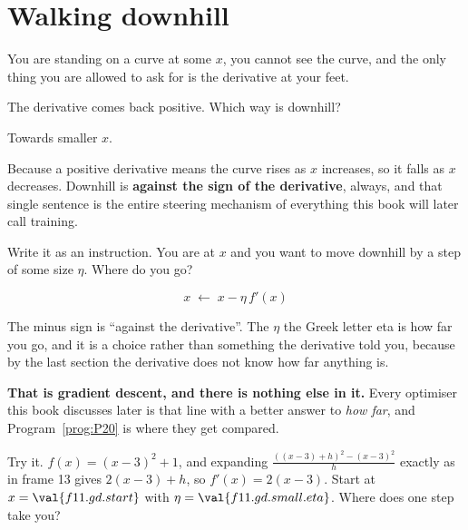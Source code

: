 \section{Walking downhill}
\label{sec:F11-downhill}

\begin{fr}
You are standing on a curve at some $x$, you cannot see the curve, and the
only thing you are allowed to ask for is the derivative at your feet.

The derivative comes back positive. Which way is downhill?
\nextframe
\end{fr}

\begin{fr}
\begin{ansblock}
Towards smaller $x$.
\end{ansblock}

Because a positive derivative means the curve rises as $x$ increases, so it
falls as $x$ decreases. Downhill is \textbf{against the sign of the
derivative}, always, and that single sentence is the entire steering mechanism
of everything this book will later call training.

Write it as an instruction. You are at $x$ and you want to move downhill by a
step of some size $\eta$. Where do you go?
\nextframe
\end{fr}

\begin{fr}
\begin{ansblock}
\[ x \;\longleftarrow\; x - \eta\, f'(x) \]
\end{ansblock}

The minus sign is \enquote{against the derivative}. The $\eta$ \dash{} the
Greek letter eta \dash{} is how far you go, and it is a choice rather than
something the derivative told you, because by the last section the derivative
does not know how far anything is.

\textbf{That is gradient descent, and there is nothing else in it.} Every
optimiser this book discusses later is that line with a better answer to
\emph{how far}, and Program~\ref{prog:P20} is where they get compared.

Try it. $f(x) = (x-3)^{2} + 1$, and expanding
$\frac{((x-3)+h)^{2} - (x-3)^{2}}{h}$ exactly as in frame 13 gives
$2(x-3) + h$, so $f'(x) = 2(x-3)$. Start at
$x = \val{f11.gd.start}$ with $\eta = \val{f11.gd.small.eta}$. Where does one
step take you?
\nextframe
\end{fr}

